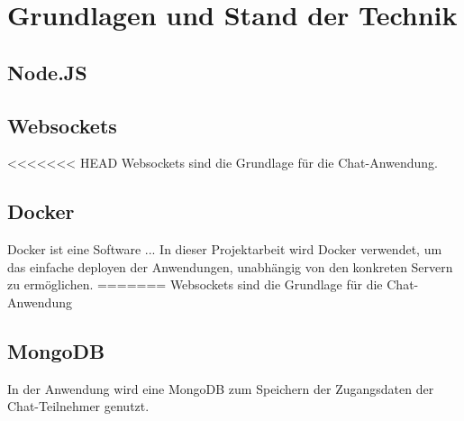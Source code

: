 
\chapter{Grundlagen und Stand der Technik}\label{cha:Grundlagen}
\section{Node.JS}\label{sec:Node.JS}

\section{Websockets}\label{sec:Websockets}
<<<<<<< HEAD
Websockets sind die Grundlage für die Chat-Anwendung.
\section{Docker}\label{sec:Docker}
Docker ist eine Software ... In dieser Projektarbeit wird Docker verwendet, um das einfache deployen der Anwendungen, unabhängig von den konkreten Servern zu ermöglichen.
=======
Websockets sind die Grundlage für die Chat-Anwendung

\section{MongoDB}\label{sec:MongoDB}
In der Anwendung wird eine MongoDB zum Speichern der Zugangsdaten der Chat-Teilnehmer genutzt.